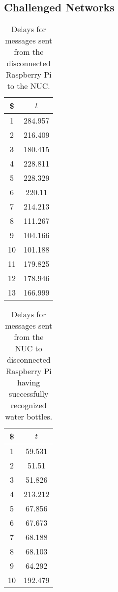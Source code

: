 \begin{appendices}
\section{Challenged Networks}
\begin{table}[H]
	\centering
	\begin{tabular}{c|c}\toprule
 \$		& $t$  \\ \midrule
		1&	284.957\\
		2&	216.409\\
		3&	180.415\\
		4&	228.811\\
		5&	228.329\\
		6&	220.11\\
		7&	214.213\\
		8&	111.267\\
		9&	104.166\\
		10&	101.188\\
		11&	179.825\\
		12&	178.946\\
		13&	166.999\\
	
	\end{tabular}
	\caption{ Delays for messages sent from the disconnected Raspberry Pi to the NUC.}
	\label{table:DIS2-results}
\end{table}


\begin{table}[H]
	\centering
	\begin{tabular}{c|c}\toprule
 \$	& $t$  \\ \midrule
		1&	59.531\\
		2&	51.51\\
		3&	51.826\\
		4&	213.212\\
		5&	67.856\\
		6&	67.673\\
		7&	68.188\\
		8&	68.103\\
		9&	64.292\\
		10&	192.479\\
		\end{tabular}
	\caption{Delays for messages sent from the NUC to disconnected Raspberry Pi having successfully recognized water bottles.}
	\label{table:DIS3-trdulyd}
\end{table}

\end{appendices}

